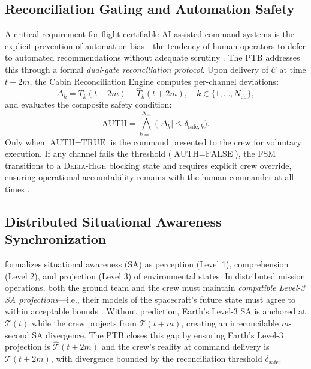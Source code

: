 \documentclass[ASNA,twocolumn]{USG}
\begin{document}
\subsection{Reconciliation Gating and Automation Safety}

A critical requirement for flight-certifiable AI-assisted command systems is the explicit
prevention of automation bias---the tendency of human operators to defer to automated
recommendations without adequate scrutiny \cite{hancock2020}. The PTB addresses this through
a formal \textit{dual-gate reconciliation protocol}. Upon delivery of \(\mathcal{C}\) at
time \(t+2m\), the Cabin Reconciliation Engine computes per-channel deviations:
\begin{equation}
  \Delta_k = T_k(t+2m) - \hat{T}_k(t+2m), \quad k \in \{1,\ldots,N_\text{ch}\},
\end{equation}
and evaluates the composite safety condition:
\begin{equation}
  \text{AUTH} = \bigwedge_{k=1}^{N_\text{ch}} \bigl(|\Delta_k| \le \delta_{\text{safe},k}\bigr).
\end{equation}
Only when \(\text{AUTH} = \text{TRUE}\) is the command presented to the crew for voluntary
execution. If any channel fails the threshold (\(\text{AUTH} = \text{FALSE}\)), the FSM
transitions to a \textsc{Delta-High} blocking state and requires explicit crew override,
ensuring operational accountability remains with the human commander at all times \cite{endsley1995}.

\subsection{Distributed Situational Awareness Synchronization}

\cite{endsley1995} formalizes situational awareness (SA) as perception (Level 1),
comprehension (Level 2), and projection (Level 3) of environmental states.
In distributed mission operations, both the ground team and the crew must maintain
\textit{compatible Level-3 SA projections}---i.e., their models of the spacecraft's
future state must agree to within acceptable bounds \cite{salas1995}.
Without prediction, Earth's Level-3 SA is anchored at \(\mathcal{T}(t)\) while the crew
projects from \(\mathcal{T}(t+m)\), creating an irreconcilable \(m\)-second SA divergence.
The PTB closes this gap by ensuring Earth's Level-3 projection is \(\hat{\mathcal{T}}(t+2m)\)
and the crew's reality at command delivery is \(\mathcal{T}(t+2m)\),
with divergence bounded by the reconciliation threshold \(\delta_\text{safe}\).
\end{document}
